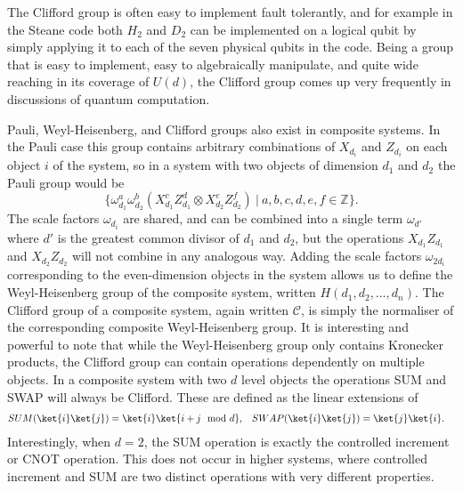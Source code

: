 The Clifford group is often easy to implement fault tolerantly, and for example in the Steane code \cite{steane-code} both $H_2$ and $D_2$ can be implemented on a logical qubit by simply applying it to each of the seven physical qubits in the code. Being a group that is easy to implement, easy to algebraically manipulate, and quite wide reaching in its coverage of $U(d)$, the Clifford group comes up very frequently in discussions of quantum computation.

Pauli, Weyl-Heisenberg, and Clifford groups also exist in composite systems. In the Pauli case this group contains arbitrary combinations of $X_{d_i}$ and $Z_{d_i}$ on each object $i$ of the system, so in a system with two objects of dimension $d_1$ and $d_2$ the Pauli group would be
\[\{\omega_{d_1}^a\omega_{d_2}^b(X_{d_1}^cZ_{d_1}^d\otimes X_{d_2}^eZ_{d_2}^f)\ |\ a, b, c, d, e, f \in \mathbb{Z}\}.\]
The scale factors $\omega_{d_i}$ are shared, and can be combined into a single term $\omega_{d'}$ where $d'$ is the greatest common divisor of $d_1$ and $d_2$, but the operations $X_{d_1}Z_{d_1}$ and $X_{d_2}Z_{d_2}$ will not combine in any analogous way. Adding the scale factors $\omega_{2d_i}$ corresponding to the even-dimension objects in the system allows us to define the Weyl-Heisenberg group of the composite system, written $H(d_1, d_2, \dots, d_n)$. The Clifford group of a composite system, again written $\mathcal{C}$, is simply the normaliser of the corresponding composite Weyl-Heisenberg group. It is interesting and powerful to note that while the Weyl-Heisenberg group only contains Kronecker products, the Clifford group can contain operations dependently on multiple objects. In a composite system with two $d$ level objects the operations SUM and SWAP will always be Clifford. These are defined as the linear extensions of
\begin{align*}
	SUM(\ket{i}\ket{j}) = \ket{i}\ket{i+j \mod d}, &&& SWAP(\ket{i}\ket{j}) = \ket{j}\ket{i}.
\end{align*}
Interestingly, when $d=2$, the SUM operation is exactly the controlled increment or CNOT operation. This does not occur in higher systems, where controlled increment and SUM are two distinct operations with very different properties.

